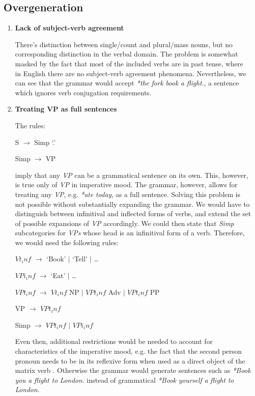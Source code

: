 \documentclass{article}
\begin{document}
	\subsection{Overgeneration}
		\begin{enumerate}
		\item
		\textbf{Lack of subject-verb agreement}
		
		There’s distinction between single/count and plural/mass nouns, but no corresponding distinction in the verbal domain. The problem is somewhat masked by the fact that most of the included verbs are in past tense, where in English there are no subject-verb agreement phenomena. Nevertheless, we can see that the grammar would accept  \emph{*the fork book a flight.}, a sentence which ignores verb conjugation requirements.
		
		\item
		\textbf{Treating VP as full sentences}
		
		The rules:
		\begin{center}
			
			S $\rightarrow$ Simp ‘.’
			
			Simp $\rightarrow$ VP
			
		\end{center}
		imply that any \emph{VP} can be a grammatical sentence on its own. This, however, is true only of \emph{VP} in imperative mood. The grammar, however, allows for treating any \emph{VP}, e.g. \emph{*ate today}, as a full sentence. Solving this problem is not possible without substantially expanding the grammar. We would have to distinguish between infinitival and inflected forms of verbs, and extend the set of possible expansions of \emph{VP} accordingly. We could then state that \emph{Simp} subcategories for \emph{VPs} whose head is an infinitival form of a verb. Therefore, we would need the following rules:
		\begin{center}
			
			$Vt_inf$ $\rightarrow$ ‘Book’ $\vert$ ‘Tell’ $\vert$ …
			
			$VPi_inf$ $\rightarrow$ ‘Eat' $\vert$ …
			
			$VPt_inf$ $\rightarrow$ $Vt_inf$ NP $\vert$ $VPt_inf$ Adv $\vert$ $VPt_inf$ PP
			
			VP $\rightarrow$ $VPt_inf$
			
			Simp $\rightarrow$ $VPt_inf$ $\vert$ $VPi_inf$
			
		\end{center}
		Even then, additional restrictions would be needed to account for characteristics of the imperative mood, e.g. the fact that the second person pronoun needs to be in its reflexive form when used as a direct object of the matrix verb \cite{palmer2001modality} . Otherwise the grammar would generate sentences such as \emph{*Book you a flight to London.} instead of grammatical \emph{*Book yourself a flight to London.}
		

\end{enumerate}
\end{document}
